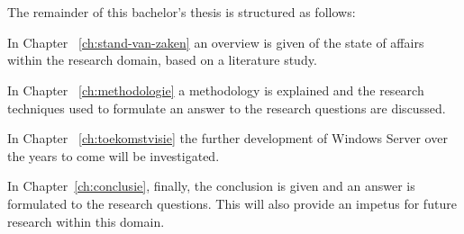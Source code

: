 \section{}
\label{sec:opzet-bachelorproef}


The remainder of this bachelor's thesis is structured as follows:

In Chapter ~\ref{ch:stand-van-zaken} an overview is given of the state of affairs within the research domain, based on a literature study.

In Chapter ~\ref{ch:methodologie} a methodology is explained and the research techniques used to formulate an answer to the research questions are discussed.


In Chapter ~\ref{ch:toekomstvisie} the further development of Windows Server over the years to come will be investigated. 

In Chapter~\ref{ch:conclusie}, finally, the conclusion is given and an answer is formulated to the research questions. This will also provide an impetus for future research within this domain.